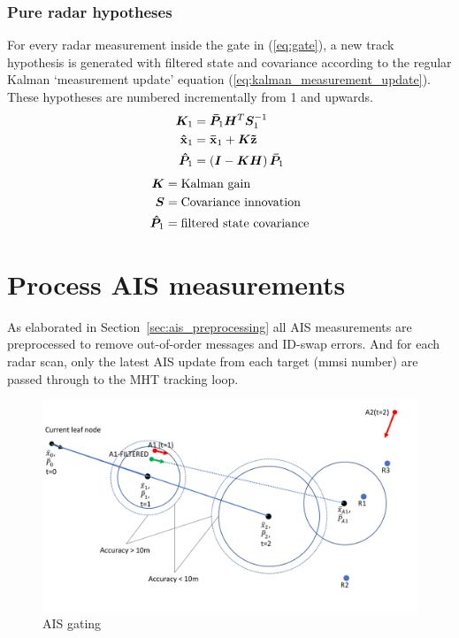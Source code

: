 \subsubsection{Pure radar hypotheses}
For every radar measurement inside the gate in (\ref{eq:gate}), a new track hypothesis is generated with filtered state and covariance according to the regular Kalman `measurement update' equation (\ref{eq:kalman_measurement_update}). These hypotheses are numbered incrementally from 1 and upwards.
\begin{equation}\label{eq:kalman_measurement_update}
\begin{split}
\bm{K}_1 	&= \bm{\bar{P}}_1 \bm{H}^T \bm{S}_1^{-1} \\
\boldsymbol{\mathbf{\hat{x}}}_1 &= \boldsymbol{\mathbf{\bar{x}}}_1 + \bm{K} \boldsymbol{\mathbf{\tilde{z}}} \\
\bm{\hat{P}}_1 &= \left( \bm{I} - \bm{K} \bm{H} \right) \bm{\bar{P}}_1 \\
\end{split}
\end{equation}
\begin{equation*}
\begin{split}
\bm{K}			&= \text{Kalman gain} \\
\bm{S}			&= \text{Covariance innovation} \\
\bm{\hat{P}}_1 	&= \text{filtered state covariance} \\
\end{split}
\end{equation*}

\section{Process AIS measurements}\label{sec:process_ais_measurements}
As elaborated in Section~\ref{sec:ais_preprocessing} all AIS measurements are preprocessed to remove out-of-order messages and ID-swap errors. And for each radar scan, only the latest AIS update from each target (\gls{mmsi} number) are passed through to the MHT tracking loop.

\begin{figure}
\centering
\includegraphics[width = .8\textwidth]{Figures/AIS_gating.pdf}
\caption{AIS gating}\label{fig:ais_gating}
\end{figure}

